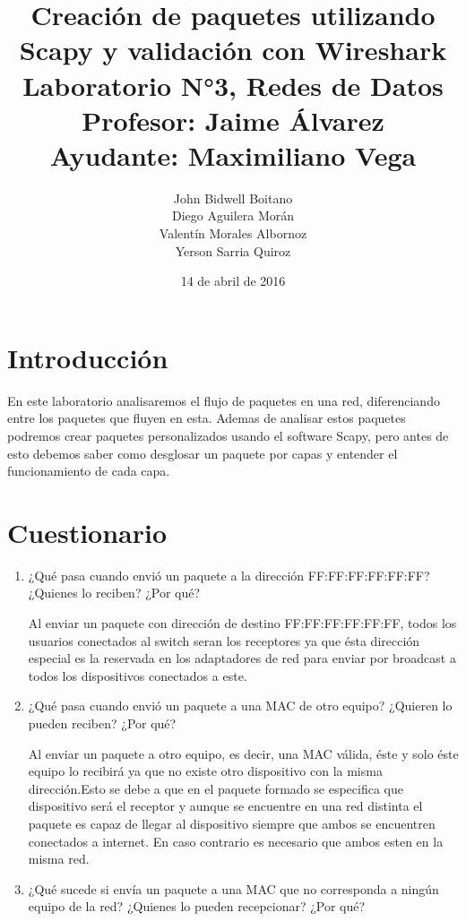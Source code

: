 \documentclass[spanish]{udpreport}
\begin{document}
\title{
	Creación de paquetes utilizando Scapy y validación con Wireshark\\[2ex]
	\normalsize
	Laboratorio N°3, Redes de Datos\\
    Profesor: Jaime Álvarez\\
	Ayudante: Maximiliano Vega
    }
\author{John Bidwell Boitano\\ Diego Aguilera Morán \\ Valentín Morales Albornoz \\ Yerson Sarria Quiroz}
\date{14 de abril de 2016}
\maketitle

\tableofcontents

\chapter{Introducción}
En este laboratorio analisaremos el flujo de paquetes en una red, diferenciando entre los paquetes que fluyen en esta.
Ademas de analisar estos paquetes podremos crear paquetes personalizados usando el software Scapy, pero antes de esto debemos saber como desglosar un paquete por capas y entender el funcionamiento de cada capa.
\chapter{Cuestionario}
\begin{enumerate}

\item¿Qué  pasa  cuando  envió  un  paquete  a  la  dirección  FF:FF:FF:FF:FF:FF?  ¿Quienes 
lo reciben? ¿Por qué?

Al enviar un paquete con dirección de destino FF:FF:FF:FF:FF:FF, todos los usuarios conectados al switch seran los receptores ya que ésta dirección especial es la reservada en los adaptadores de red para enviar por broadcast a todos los dispositivos conectados a este.

\item¿Qué  pasa  cuando  envió  un  paquete  a  una  MAC  de  otro  equipo?  ¿Quieren  lo pueden reciben? ¿Por qué?

Al enviar un paquete a otro equipo, es decir, una MAC válida, éste y solo éste equipo lo recibirá ya que no existe otro dispositivo con la misma dirección.Esto se debe a que en el paquete formado se especifica que dispositivo será el receptor y aunque se encuentre en una red distinta el paquete es capaz de llegar al dispositivo siempre que ambos se encuentren conectados a internet. En caso contrario es necesario que ambos esten en la misma red.

\item¿Qué  sucede  si  envía  un  paquete  a  una  MAC  que  no  corresponda  a  ningún  equipo de la red? ¿Quienes lo pueden recepcionar? ¿Por qué?

\end{enumerate}
\end{document}
